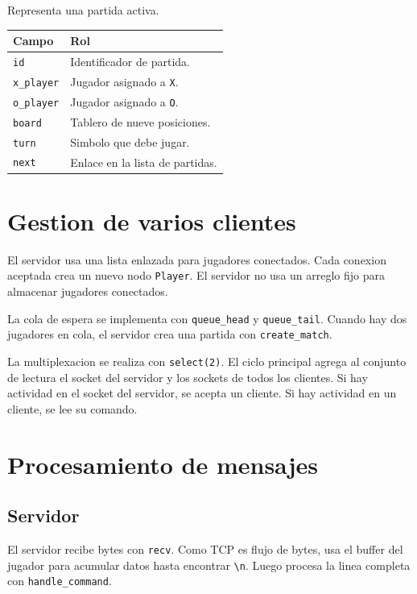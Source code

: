 \documentclass[12pt,a4paper]{article}
\begin{document}
Representa una partida activa.

\begin{longtable}{|p{4cm}|p{9cm}|}
\hline
\textbf{Campo} & \textbf{Rol} \\
\hline
\texttt{id} & Identificador de partida. \\
\hline
\texttt{x\_player} & Jugador asignado a \texttt{X}. \\
\hline
\texttt{o\_player} & Jugador asignado a \texttt{O}. \\
\hline
\texttt{board} & Tablero de nueve posiciones. \\
\hline
\texttt{turn} & Simbolo que debe jugar. \\
\hline
\texttt{next} & Enlace en la lista de partidas. \\
\hline
\end{longtable}

\section{Gestion de varios clientes}

El servidor usa una lista enlazada para jugadores conectados. Cada conexion
aceptada crea un nuevo nodo \texttt{Player}. El servidor no usa un arreglo fijo
para almacenar jugadores conectados.

La cola de espera se implementa con \texttt{queue\_head} y
\texttt{queue\_tail}. Cuando hay dos jugadores en cola, el servidor crea una
partida con \texttt{create\_match}.

La multiplexacion se realiza con \texttt{select(2)}. El ciclo principal agrega
al conjunto de lectura el socket del servidor y los sockets de todos los
clientes. Si hay actividad en el socket del servidor, se acepta un cliente. Si
hay actividad en un cliente, se lee su comando.

\section{Procesamiento de mensajes}

\subsection{Servidor}

El servidor recibe bytes con \texttt{recv}. Como TCP es flujo de bytes, usa el
buffer del jugador para acumular datos hasta encontrar \texttt{\textbackslash n}.
Luego procesa la linea completa con \texttt{handle\_command}.
\end{document}
